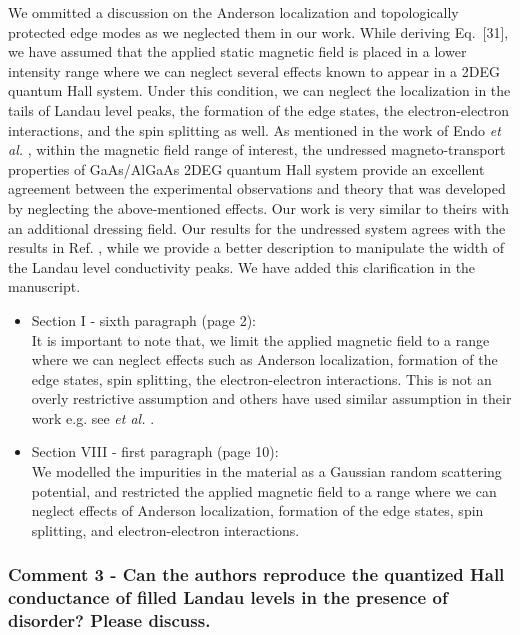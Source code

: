 \documentclass{article}
\begin{document}
We ommitted a discussion on the Anderson localization and topologically protected edge modes as we neglected them in our work.
While deriving Eq.~[31], we have assumed that the applied static magnetic field is placed in a lower intensity range where we can neglect several effects known to appear in a 2DEG quantum Hall system. Under this condition, we can neglect the localization in the tails of Landau level peaks, the formation of the edge states, the electron-electron interactions, and the spin splitting as well. As mentioned in the work of Endo \textit{et al.} \cite{endo09}, within the magnetic field range of interest, the undressed
magneto-transport properties of GaAs/AlGaAs 2DEG quantum Hall system provide an excellent agreement between the experimental observations and theory that was developed by neglecting the above-mentioned effects. Our work is very similar to theirs with an additional dressing field. Our results for the undressed system agrees with the results in Ref. \cite{endo09}, while we provide a better description to manipulate the width of the Landau level conductivity peaks. We have added this clarification in the manuscript.

\begin{itemize}
  \item Section I - sixth paragraph (page 2):\\
  {\color{Red}
  It is important to note that, we limit the applied magnetic field to a range where we can neglect effects such as Anderson localization, formation of the edge states, spin splitting, the electron-electron interactions. This is not an overly restrictive assumption and others have used similar assumption in their work e.g. see \textit{et al.} \cite{endo09}.
  }
  \item Section VIII - first paragraph (page 10):\\
  {\color{Red}
  We modelled the impurities in the material as a Gaussian random scattering potential, and restricted the applied magnetic field to a range where we can neglect effects of Anderson localization, formation of the edge states, spin splitting, and electron-electron interactions.
  }
\end{itemize}


\subsubsection*{Comment 3 -
\color{RoyalBlue} Can the authors reproduce the quantized Hall conductance of filled Landau levels in the presence of disorder? Please discuss.
}
\end{document}
